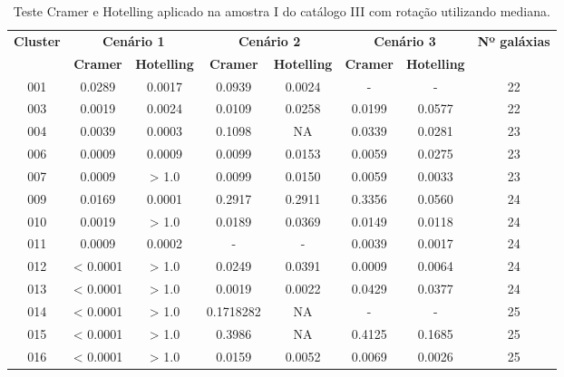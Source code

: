 {\scriptsize
\begin{longtable}{cccccccc}
\caption{Teste Cramer e Hotelling aplicado na amostra I do catálogo III com rotação utilizando mediana.}
\label{tab:sorirotation2}
\hline
\multirow{2}{*}{\textbf{Cluster}} & \multicolumn{2}{|c|}{\textbf{Cenário 1}} & \multicolumn{2}{c|}{\textbf{Cenário 2}} & \multicolumn{2}{c|}{\textbf{Cenário 3}} & \multirow{2}{*}{\textbf{Nº galáxias}} \\ \cline{2-7}
                         & \multicolumn{1}{|c}{\textbf{Cramer}}       & \textbf{Hotelling}       & \textbf{Cramer}       & \textbf{Hotelling}       & \textbf{Cramer}       & \textbf{Hotelling}                              \\ \hline
001 & {\color{red}0.0289} & {\color{red}0.0017} & 0.0939 & {\color{red}0.0024} & - & - &  22 \\  
003 & {\color{red}0.0019} & {\color{red}0.0024} & {\color{red}0.0109} & {\color{red}0.0258} & {\color{red}0.0199} & 0.0577 & 22 \\
004 & {\color{red}0.0039} & {\color{red}0.0003} & 0.1098 & NA & {\color{red}0.0339} & {\color{red}0.0281} & 23 \\
006 & {\color{red}0.0009} & {\color{red}0.0009} & {\color{red}0.0099} & {\color{red}0.0153} & {\color{red}0.0059} & {\color{red}0.0275} & 23 \\
007 & {\color{red}0.0009} & > 1.0 & {\color{red}0.0099} & {\color{red}0.0150} & {\color{red}0.0059} & {\color{red}0.0033} & 23 \\
009 & {\color{red}0.0169} & {\color{red}0.0001} & 0.2917 & 0.2911 & 0.3356 & 0.0560 & 24 \\
010 & {\color{red}0.0019} & > 1.0 & {\color{red}0.0189} & {\color{red}0.0369} & {\color{red}0.0149} & {\color{red}0.0118} & 24 \\
011 & {\color{red}0.0009} & {\color{red}0.0002} & - & - &  {\color{red}0.0039} & {\color{red}0.0017} & 24 \\
012 & {\color{red} < 0.0001} & > 1.0 & {\color{red}0.0249} & {\color{red}0.0391} & {\color{red}0.0009} & {\color{red}0.0064} & 24 \\
013 & {\color{red} < 0.0001} & > 1.0 & 0.0019 & 0.0022 & 0.0429 & 0.0377 & 24 \\
014 & {\color{red} < 0.0001} & > 1.0 & 0.1718282 & NA & - & - & 25 \\
015 & {\color{red} < 0.0001} & > 1.0 & 0.3986 & NA & 0.4125 & 0.1685 & 25 \\
016 & {\color{red} < 0.0001} & > 1.0 & {\color{red}0.0159} & {\color{red}0.0052} & {\color{red}0.0069} & {\color{red}0.0026} & 25 \\

\end{longtable}}
